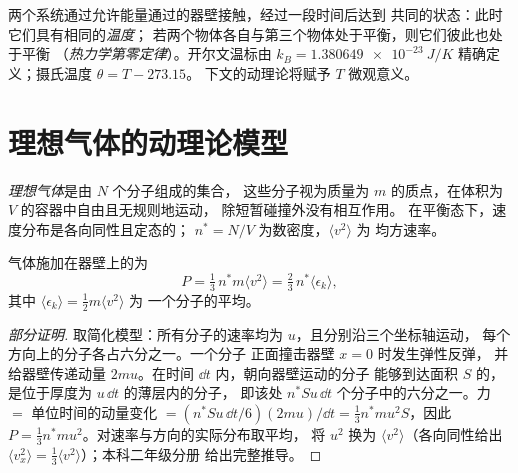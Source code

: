 \begin{definition}[温度]\label{def:b1:kinetic-theory:temperature}
两个系统通过允许能量通过的器壁接触，经过一段时间后达到
共同的状态：此时它们具有相同的\emph{温度}；
若两个物体各自与第三个物体处于平衡，则它们彼此也处于平衡
（\emph{热力学第零定律}）。开尔文温标由
$k_B = \qty{1.380649e-23}{J/K}$ 精确定义；摄氏温度 $\theta = T - 273.15$。
下文的动理论将赋予 $T$ 微观意义。
\end{definition}

\section{理想气体的动理论模型}

\begin{definition}[理想气体的微观模型]\label{def:b1:kinetic-theory:model}
\emph{理想气体}是由 $N$ 个分子组成的集合，
这些分子视为质量为 $m$ 的质点，在体积为 $V$ 的容器中自由且无规则地运动，
除短暂碰撞外没有相互作用。
在平衡态下，速度分布是各向同性且定态的；
$n^* = N/V$ 为数密度，$\langle v^2\rangle$ 为
均方速率。
\end{definition}

\begin{theorem}[动理论压强]\label{thm:b1:kinetic-theory:pressure}
气体施加在器壁上的为
\[
P = \tfrac13\,n^*m\langle v^2\rangle = \tfrac23\,n^*\langle\epsilon_k\rangle ,
\]
其中 $\langle\epsilon_k\rangle = \tfrac12 m\langle v^2\rangle$ 为
一个分子的平均。
\end{theorem}

\begin{proof}[部分证明]
取简化模型：所有分子的速率均为 $u$，且分别沿三个坐标轴运动，
每个方向上的分子各占六分之一。一个分子
正面撞击器壁 $x = 0$ 时发生弹性反弹，
并给器壁传递动量 $2mu$。在时间 $\dd t$ 内，朝向器壁运动的分子
能够到达面积 $S$ 的，是位于厚度为 $u\,\dd t$ 的薄层内的分子，
即该处 $n^*Su\,\dd t$ 个分子中的六分之一。力 $= $
单位时间的动量变化 $= (n^*Su\,\dd t/6)(2mu)/\dd t = \tfrac13 n^*mu^2S$，因此
$P = \tfrac13 n^*mu^2$。对速率与方向的实际分布取平均，
将 $u^2$ 换为 $\langle v^2\rangle$（各向同性给出
$\langle v_x^2\rangle = \tfrac13\langle v^2\rangle$）；本科二年级分册
给出完整推导。
\end{proof}

